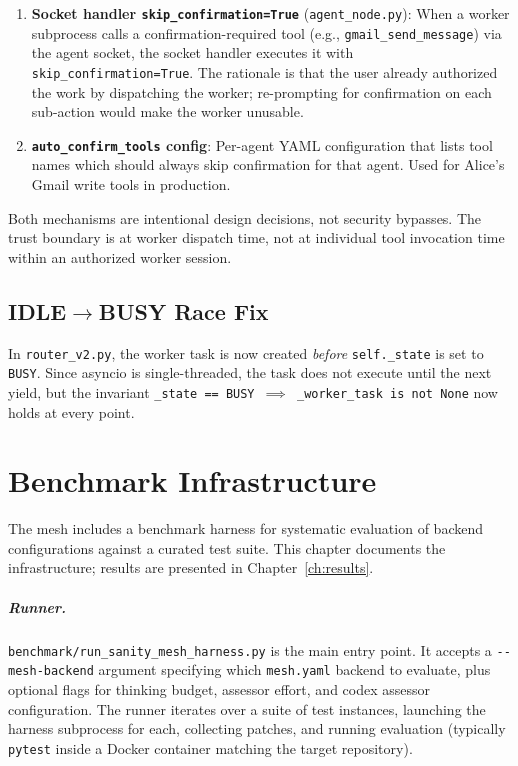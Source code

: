 \documentclass[11pt,letterpaper]{report}
\newcommand{\code}[1]{\texttt{#1}}
\begin{document}
\begin{enumerate}[nosep]
  \item \textbf{Socket handler \code{skip\_confirmation=True}}
    (\code{agent\_node.py}): When a worker subprocess calls a
    confirmation-required tool (e.g., \code{gmail\_send\_message}) via
    the agent socket, the socket handler executes it with
    \code{skip\_confirmation=True}. The rationale is that the user already
    authorized the work by dispatching the worker; re-prompting for
    confirmation on each sub-action would make the worker unusable.

  \item \textbf{\code{auto\_confirm\_tools} config}: Per-agent YAML
    configuration that lists tool names which should always skip
    confirmation for that agent. Used for Alice's Gmail write tools in
    production.
\end{enumerate}

\noindent Both mechanisms are intentional design decisions, not security
bypasses. The trust boundary is at worker dispatch time, not at
individual tool invocation time within an authorized worker session.


\section{IDLE$\to$BUSY Race Fix}

In \code{router\_v2.py}, the worker task is now created
\emph{before} \code{self.\_state} is set to \code{BUSY}. Since asyncio
is single-threaded, the task does not execute until the next yield, but
the invariant \code{\_state == BUSY $\implies$ \_worker\_task is not
None} now holds at every point.


\chapter{Benchmark Infrastructure}
\label{ch:benchmarks}

The mesh includes a benchmark harness for systematic evaluation of
backend configurations against a curated test suite. This chapter
documents the infrastructure; results are presented in
Chapter~\ref{ch:results}.

\paragraph{Runner.}
\code{benchmark/run\_sanity\_mesh\_harness.py} is the main entry point.
It accepts a \code{-{}-mesh-backend} argument specifying which
\code{mesh.yaml} backend to evaluate, plus optional flags for thinking
budget, assessor effort, and codex assessor configuration. The runner
iterates over a suite of test instances, launching the harness
subprocess for each, collecting patches, and running evaluation
(typically \code{pytest} inside a Docker container matching the target
repository).
\end{document}
